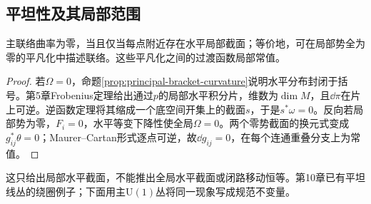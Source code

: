 \subsection{平坦性及其局部范围}
\begin{theorem}\label{thm:principal-flat}
主联络曲率为零，当且仅当每点附近存在水平局部截面；等价地，可在局部势全为零的平凡化中描述联络。这些平凡化之间的过渡函数局部常值。
\end{theorem}
\begin{proof}
若$\Omega=0$，命题\ref{prop:principal-bracket-curvature}说明水平分布封闭于括号。第5章Frobenius定理给出通过$p$的局部水平积分片，维数为$\dim M$，且$\dd\pi$在片上可逆。逆函数定理将其缩成一个底空间开集上的截面$s$，于是$s^*\omega=0$。反向若局部势为零，$F_i=0$，水平等变下降性使全局$\Omega=0$。两个零势截面的换元式变成$g_{ij}^*\theta=0$；Maurer--Cartan形式逐点可逆，故$\dd g_{ij}=0$，在每个连通重叠分支上为常值。
\end{proof}
这只给出局部水平截面，不能推出全局水平截面或闭路移动恒等。第10章已有平坦线丛的绕圈例子；下面用主$\mathrm U(1)$丛将同一现象写成规范不变量。
